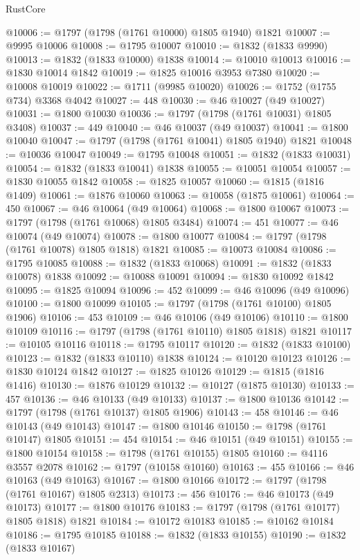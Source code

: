 \begin{lexlean}{RustCore}
\begin{coremodule}
@10006 := @1797 (@1798 (@1761 @10000) @1805 @1940) @1821
@10007 := @9995 @10006
@10008 := @1795 @10007
@10010 := @1832 (@1833 @9990)
@10013 := @1832 (@1833 @10000) @1838
@10014 := @10010 @10013
@10016 := @1830 @10014 @1842
@10019 := @1825 @10016 @3953 @7380
@10020 := @10008 @10019
@10022 := @1711 (@9985 @10020)
@10026 := @1752 (@1755 @734) @3368 @4042
@10027 := 448
@10030 := @46 @10027 (@49 @10027)
@10031 := @1800 @10030
@10036 := @1797 (@1798 (@1761 @10031) @1805 @3408)
@10037 := 449
@10040 := @46 @10037 (@49 @10037)
@10041 := @1800 @10040
@10047 := @1797 (@1798 (@1761 @10041) @1805 @1940) @1821
@10048 := @10036 @10047
@10049 := @1795 @10048
@10051 := @1832 (@1833 @10031)
@10054 := @1832 (@1833 @10041) @1838
@10055 := @10051 @10054
@10057 := @1830 @10055 @1842
@10058 := @1825 @10057
@10060 := @1815 (@1816 @1409)
@10061 := @1876 @10060
@10063 := @10058 (@1875 @10061)
@10064 := 450
@10067 := @46 @10064 (@49 @10064)
@10068 := @1800 @10067
@10073 := @1797 (@1798 (@1761 @10068) @1805 @3484)
@10074 := 451
@10077 := @46 @10074 (@49 @10074)
@10078 := @1800 @10077
@10084 := @1797 (@1798 (@1761 @10078) @1805 @1818) @1821
@10085 := @10073 @10084
@10086 := @1795 @10085
@10088 := @1832 (@1833 @10068)
@10091 := @1832 (@1833 @10078) @1838
@10092 := @10088 @10091
@10094 := @1830 @10092 @1842
@10095 := @1825 @10094
@10096 := 452
@10099 := @46 @10096 (@49 @10096)
@10100 := @1800 @10099
@10105 := @1797 (@1798 (@1761 @10100) @1805 @1906)
@10106 := 453
@10109 := @46 @10106 (@49 @10106)
@10110 := @1800 @10109
@10116 := @1797 (@1798 (@1761 @10110) @1805 @1818) @1821
@10117 := @10105 @10116
@10118 := @1795 @10117
@10120 := @1832 (@1833 @10100)
@10123 := @1832 (@1833 @10110) @1838
@10124 := @10120 @10123
@10126 := @1830 @10124 @1842
@10127 := @1825 @10126
@10129 := @1815 (@1816 @1416)
@10130 := @1876 @10129
@10132 := @10127 (@1875 @10130)
@10133 := 457
@10136 := @46 @10133 (@49 @10133)
@10137 := @1800 @10136
@10142 := @1797 (@1798 (@1761 @10137) @1805 @1906)
@10143 := 458
@10146 := @46 @10143 (@49 @10143)
@10147 := @1800 @10146
@10150 := @1798 (@1761 @10147) @1805
@10151 := 454
@10154 := @46 @10151 (@49 @10151)
@10155 := @1800 @10154
@10158 := @1798 (@1761 @10155) @1805
@10160 := @4116 @3557 @2078
@10162 := @1797 (@10158 @10160)
@10163 := 455
@10166 := @46 @10163 (@49 @10163)
@10167 := @1800 @10166
@10172 := @1797 (@1798 (@1761 @10167) @1805 @2313)
@10173 := 456
@10176 := @46 @10173 (@49 @10173)
@10177 := @1800 @10176
@10183 := @1797 (@1798 (@1761 @10177) @1805 @1818) @1821
@10184 := @10172 @10183
@10185 := @10162 @10184
@10186 := @1795 @10185
@10188 := @1832 (@1833 @10155)
@10190 := @1832 (@1833 @10167)

\end{coremodule}
\end{lexlean}

